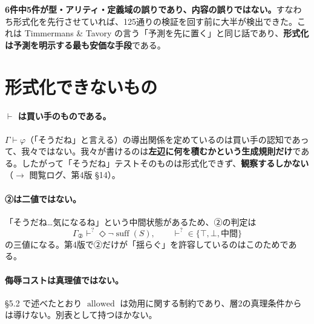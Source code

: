 \documentclass[11pt,a4paper]{article}
\newcommand{\suff}{\operatorname{suff}}
\newcommand{\allowed}{\operatorname{allowed}}
\begin{document}
\medskip
\noindent
\textbf{6件中5件が型・アリティ・定義域の誤りであり、内容の誤りではない。}すなわち形式化を先行させていれば、125通りの検証を回す前に大半が検出できた。これは Timmermans \& Tavory の言う「予測を先に置く」と同じ話であり、\textbf{形式化は予測を明示する最も安価な手段}である。

\section{形式化できないもの}

\paragraph{$\vdash$ は買い手のものである。}
$\Gamma \vdash \varphi$（「そうだね」と言える）の導出関係を定めているのは買い手の認知であって、我々ではない。我々が書けるのは\textbf{左辺に何を積むかという生成規則だけ}である。したがって「そうだね」テストそのものは形式化できず、\textbf{観察するしかない}（$\to$ 閲覧ログ、第4版 \S14）。

\paragraph{②は二値ではない。}
「そうだね\dots{}気になるね」という中間状態があるため、②の判定は
\[
\Gamma_{②} \vdash^{?} \Diamond\neg\suff(S), \qquad \vdash^{?} \in \{\top, \bot, \text{中間}\}
\]
の三値になる。第4版で②だけが「揺らぐ」を許容しているのはこのためである。

\paragraph{侮辱コストは真理値ではない。}
\S5.2 で述べたとおり $\allowed$ は効用に関する制約であり、層2の真理条件からは導けない。別表として持つほかない。
\end{document}
